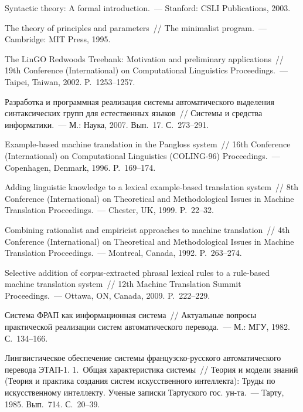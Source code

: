 \begin{multicols}{2}
{{\begin{thebibliography}{99}
     Syntactic theory: A formal introduction.~--- Stanford: CSLI Publications, 
2003.
     
     The theory of principles and parameters~// The minimalist program.~--- 
Cambridge: MIT Press, 1995.
     
     The LinGO Redwoods Treebank: Motivation and preliminary 
applications~// 19th Conference (International) on Computational Linguistics 
Proceedings.~--- Taipei, Taiwan, 2002. P.~1253--1257.
     
     Разработка и программная реализация сис\-те\-мы автоматического 
выделения синтаксических групп для естественных языков~// Системы и 
средства информатики.~--- М.: Наука, 2007. Вып.~17. С.~273--291. 
      
      Example-based machine translation in the Pangloss system~// 16th 
Conference (International) on Computational Linguistics (COLING-96) 
Proceedings.~--- Copenhagen, Denmark, 1996. P.~169--174.
      
      Adding linguistic knowledge to a lexical example-based translation 
system~// 8th Conference (International) on Theoretical and Methodological Issues 
in Machine Translation Proceedings.~--- Chester, UK, 1999. P.~22--32.
     
     Combining rationalist and empiricist approaches to machine translation~// 
4th Conference (International) on Theoretical and Methodological Issues in 
Machine Translation Proceedings.~--- Montreal, Canada, 1992. P.~263--274.
     
     Selective addition of corpus-extracted phrasal lexical rules to a rule-based 
machine translation system~// 12th Machine Translation Summit Proceedings.~--- 
Ottawa, ON, Canada, 2009. P.~222--229.
     
     Система ФРАП как информационная сис\-те\-ма~// Актуальные вопросы 
практической реализации сис\-тем автоматического перевода.~--- М.: МГУ, 
1982. С.~134--166.
     
     Лингвистическое обеспечение сис\-те\-мы фран\-цуз\-ско-рус\-ско\-го 
автоматического перевода ЭТАП-1. 1.~Общая характеристика сис\-те\-мы~// 
Теория и модели знаний (Теория и практика создания сис\-тем 
искусственного интеллекта): Труды по искусственному интеллекту. Ученые 
записки Тартуского гос. ун-та.~--- Тарту, 1985. 
Вып.~714. С.~20--39.
     

\end{thebibliography}}}
\end{multicols}
